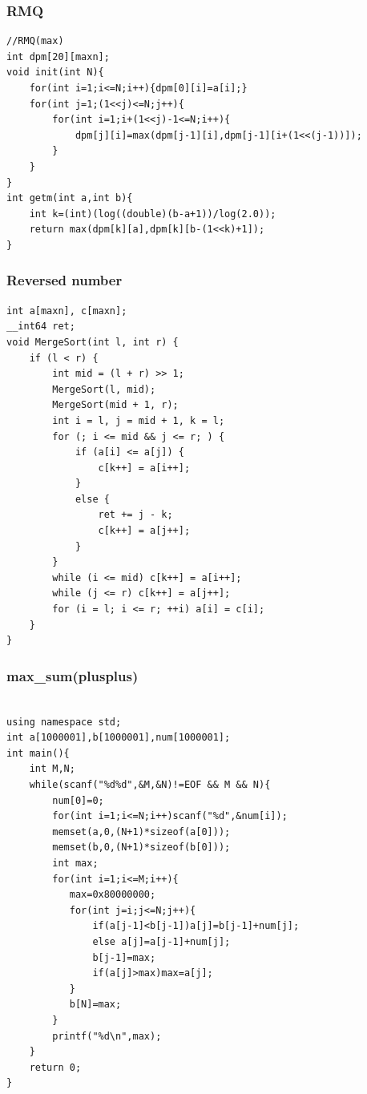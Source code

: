 \documentclass[a4paper]{article}
\begin{document}
\begin{CJK*}{UTF8}{gbsn}
\begin{multicols}{3}
\begin{flushleft}
\subsubsection{RMQ}
\begin{lstlisting}
//RMQ(max)
int dpm[20][maxn];
void init(int N){
    for(int i=1;i<=N;i++){dpm[0][i]=a[i];}
    for(int j=1;(1<<j)<=N;j++){
        for(int i=1;i+(1<<j)-1<=N;i++){
            dpm[j][i]=max(dpm[j-1][i],dpm[j-1][i+(1<<(j-1))]);
        }
    }
}
int getm(int a,int b){
    int k=(int)(log((double)(b-a+1))/log(2.0));
    return max(dpm[k][a],dpm[k][b-(1<<k)+1]);
}
\end{lstlisting}

\subsubsection{Reversed number}
\begin{lstlisting}
int a[maxn], c[maxn];
__int64 ret;
void MergeSort(int l, int r) {
    if (l < r) {
        int mid = (l + r) >> 1;
        MergeSort(l, mid);
        MergeSort(mid + 1, r);
        int i = l, j = mid + 1, k = l;
        for (; i <= mid && j <= r; ) {
            if (a[i] <= a[j]) {
                c[k++] = a[i++];
            }
            else {
                ret += j - k;
                c[k++] = a[j++];
            }
        }
        while (i <= mid) c[k++] = a[i++];
        while (j <= r) c[k++] = a[j++];
        for (i = l; i <= r; ++i) a[i] = c[i];
    }
}
\end{lstlisting}

\subsubsection{max\_sum(plusplus)}
\begin{lstlisting}

using namespace std;
int a[1000001],b[1000001],num[1000001];
int main(){
    int M,N;
    while(scanf("%d%d",&M,&N)!=EOF && M && N){
        num[0]=0;
        for(int i=1;i<=N;i++)scanf("%d",&num[i]);
        memset(a,0,(N+1)*sizeof(a[0]));
        memset(b,0,(N+1)*sizeof(b[0]));
        int max;
        for(int i=1;i<=M;i++){
           max=0x80000000;
           for(int j=i;j<=N;j++){
               if(a[j-1]<b[j-1])a[j]=b[j-1]+num[j];
               else a[j]=a[j-1]+num[j];
               b[j-1]=max;
               if(a[j]>max)max=a[j];
           }
           b[N]=max;
        }
        printf("%d\n",max);
    }
    return 0;
}
\end{lstlisting}


\end{flushleft}
\end{multicols}
\end{CJK*}
\end{document}
